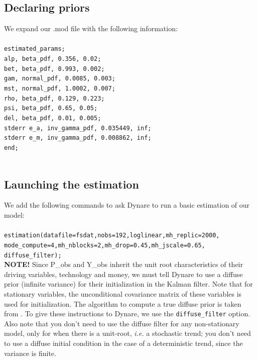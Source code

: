 \subsection{Declaring priors}
We expand our .mod file with the following information: \\
\\
\texttt{estimated\_params;\\
alp, beta\_pdf, 0.356, 0.02; \\ 
bet, beta\_pdf, 0.993, 0.002; \\
gam, normal\_pdf, 0.0085, 0.003; \\
mst, normal\_pdf, 1.0002, 0.007; \\
rho, beta\_pdf, 0.129, 0.223;\\
psi, beta\_pdf, 0.65, 0.05;\\
del, beta\_pdf, 0.01, 0.005;\\
stderr e\_a, inv\_gamma\_pdf, 0.035449, inf;\\
stderr e\_m, inv\_gamma\_pdf, 0.008862, inf;\\
end;}\\
\\

\subsection{Launching the estimation}
We add the following commands to ask Dynare to run a basic estimation of our model:\\
\\
\texttt{estimation(datafile=fsdat,nobs=192,loglinear,mh\_replic=2000,\\
mode\_compute=4,mh\_nblocks=2,mh\_drop=0.45,mh\_jscale=0.65,\\
diffuse\_filter);}\\

\textsf{\textbf{NOTE!}} Since P\_obs and Y\_obs inherit the unit root characteristics of their driving variables, technology and money, we must tell Dynare to use a diffuse prior (infinite variance) for their initialization in the Kalman filter. Note that for stationary variables, the unconditional covariance matrix of these variables is used for initialization. The algorithm to compute a true diffuse prior is taken from \citet{DurbinKoopman2001}. To give these instructions to Dynare, we use the \texttt{diffuse\_filter} option. Also note that you don't need to use the diffuse filter for any non-stationary model, only for when there is a unit-root, \textit{i.e.} a stochastic trend; you don't need to use a diffuse initial condition in the case of a deterministic trend, since the variance is finite.\\

